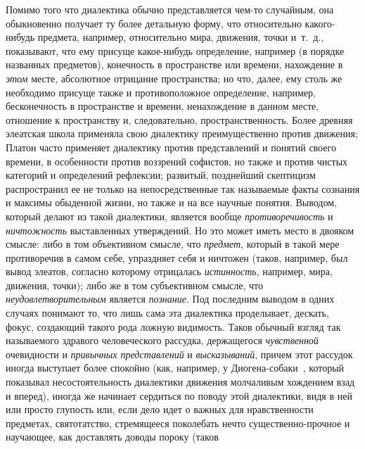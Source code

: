 \documentclass[twoside]{article}
\begin{document}
Помимо того что диалектика обычно представляется чем-то
случайным, она обыкновенно получает ту более детальную форму, что
относительно какого-нибудь предмета, например, относительно мира, движения,
точки и~т.~д., показывают, что ему присуще какое-нибудь определение,
например (в порядке названных предметов), конечность в пространстве или
времени, нахождение в {\em этом}
месте, абсолютное отрицание пространства; но что, далее, ему
столь же необходимо присуще также и противоположное определение, например,
бесконечность в пространстве и времени, ненахождение в данном месте,
отношение к пространству и, следовательно, пространственность. Более
древняя элеатская школа применяла свою диалектику преимущественно против
движения; Платон часто применяет диалектику против представлений и понятий
своего времени, в особенности против воззрений софистов, но также и против
чистых категорий и определений рефлексии; развитый, позднейший скептицизм
распространил ее не только на непосредственные так называемые факты
сознания и максимы обыденной жизни, но также и на все научные понятия.
Выводом, который делают из такой диалектики, является вообще
{\em противоречивость} и
{\em ничтожность}
выставленных утверждений. Но это может иметь место в двояком
смысле: либо в том объективном смысле, что
{\em предмет}, который в
такой мере противоречив в самом себе, упраздняет себя и ничтожен (таков,
например, был вывод элеатов, согласно которому отрицалась
{\em истинность},
например, мира, движения, точки); либо же в том субъективном
смысле, что {\em неудовлетворительным}
является {\em познание}.
Под последним выводом в одних случаях понимают то, что лишь
сама эта диалектика проделывает, дескать, фокус, создающий такого рода
ложную видимость. Таков обычный взгляд так называемого здравого
человеческого рассудка, держащегося
{\em чувственной}
очевидности и
{\em привычных представлений}
и {\em высказываний},
причем этот рассудок иногда выступает более спокойно (как,
например, у
Диогена-собаки~\label{bkm:bm123},
который показывал несостоятельность диалектики движения
молчаливым хождением взад и вперед), иногда же начинает сердиться по поводу
этой диалектики, видя в ней или просто глупость или, если дело идет о
важных для нравственности предметах, святотатство, стремящееся поколебать
нечто существенно-прочное и научающее, как доставлять доводы пороку (таков
\end{document}
